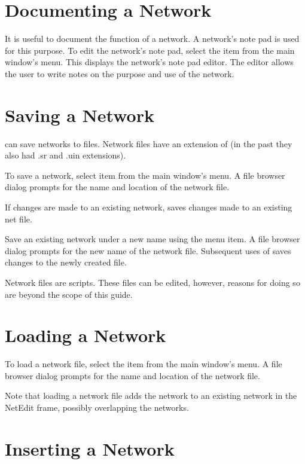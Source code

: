 \section{Documenting a Network}
\label{sec:docnetwork}

It is useful to document the function of a network.  A network's note
pad is used for this purpose.  To edit the network's note pad,
select the  item from the main window's 
menu.  This displays the network's note pad editor.  The editor
allows the user to write notes on the purpose and use of the network.

\section{Saving a Network}
\label{sec:savenet}

\sr{} can save networks to files.  Network files have an extension of
 (in the past they also had .sr and .uin
extensions).  

To save a network, select  item from the main window's
 menu.  A file browser dialog prompts for the
name and location of the network file.

If  changes are made to an existing network,  
saves changes made to an existing net file.

Save an existing network under a new name using the
 menu item.  A file browser dialog prompts
for the new name of the network file.  Subsequent uses of
 saves changes to the newly created file.

Network files are   scripts.
These files can be edited, however, reasons for doing so are beyond
the scope of this guide.

\section{Loading a Network}
\label{sec:opennet}

To load a network file, select the  item from the main
window's  menu.   A file browser dialog prompts for the
name and location of the network file.

Note that loading a network file adds the network to an existing network in
the NetEdit frame, possibly overlapping the networks.

\section{Inserting a Network}
\label{sec:insertnetwork}

